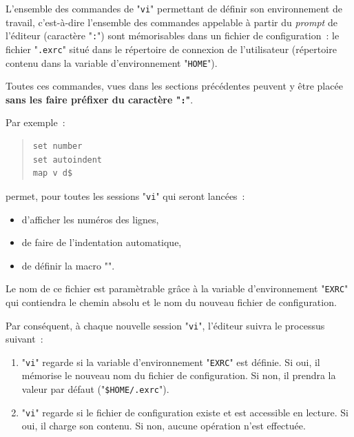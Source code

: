 L'ensemble des commandes de "{\tt vi}" permettant de d{\'e}finir
son environnement de travail, c'est-{\`a}-dire l'ensemble des
commandes appelable {\`a} partir du {\sl prompt} de l'{\'e}diteur
(caract{\`e}re "{\tt :}") sont m{\'e}morisables dans un fichier
de configuration~: le fichier "{\tt .exrc}" situ{\'e} dans
le r{\'e}pertoire de connexion de l'utilisateur (r{\'e}pertoire
contenu dans la variable d'environnement "{\tt HOME}").

Toutes ces commandes, vues dans les sections pr{\'e}c{\'e}dentes
peuvent y {\^e}tre plac{\'e}e {\bf sans les faire pr{\'e}fixer
du caract{\`e}re "{\tt :}"}.

Par exemple~:
\begin{quote}
\begin{verbatim}
set number
set autoindent
map v d$
\end{verbatim}
\end{quote}
permet, pour toutes les sessions "{\tt vi}" qui seront lanc{\'e}es~:
\begin{itemize}
	\item	d'afficher les num{\'e}ros des lignes,
	\item	de faire de l'indentation automatique,
	\item	de d{\'e}finir la macro "".
\end{itemize}

Le nom de ce fichier est param{\`e}trable gr{\^a}ce {\`a} la variable
d'environnement "{\tt EXRC}" qui contiendra le chemin absolu et
le nom du nouveau fichier de configuration.

Par cons{\'e}quent, {\`a} chaque nouvelle session "{\tt vi}",
l'{\'e}diteur suivra le processus suivant~:
\begin{enumerate}
	\item	"{\tt vi}" regarde si la variable d'environnement
			"{\tt EXRC}" est d{\'e}finie. Si oui, il m{\'e}morise
			le nouveau nom du fichier de configuration. Si non,
			il prendra la valeur par d{\'e}faut ("{\tt \$HOME/.exrc}").
	\item	"{\tt vi}" regarde si le fichier de configuration
			existe et est accessible en lecture. Si oui, il charge son
			contenu. Si non, aucune op{\'e}ration n'est effectu{\'e}e.
\end{enumerate}
